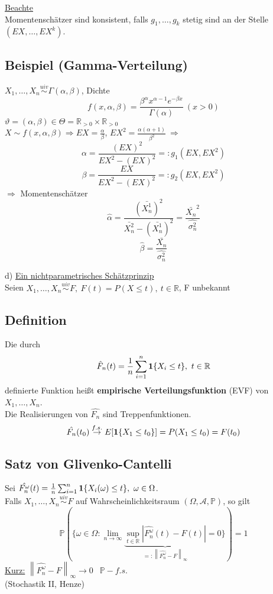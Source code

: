 \documentclass[a4paper,11pt,twoside,titlepage]{article}
\newcommand{\R}{{\mathbb R}}
\newcommand{\PP}{{\mathbb P}} %
\newcommand\AAA{ \mathcal{A} } %
\newcommand{\ind}{\text{\bf{1}}} %
\newcommand{\uiv}{\ensuremath{\stackrel{uiv}{\sim}}}
\begin{document}
\underline{Beachte}\\
Momentenschätzer sind konsistent, falls $g_1,\ldots,g_k$ stetig sind an der Stelle $(EX,\ldots,EX^k)$.

\subsection{Beispiel (Gamma-Verteilung)}
$X_1,\ldots,X_n\uiv \Gamma(\alpha,\beta)$, Dichte $$f(x,\alpha,\beta)=\frac{\beta^{\alpha}x^{\alpha-1}e^{-\beta x}}{\Gamma(\alpha)}\ (x>0)$$
$\vartheta=(\alpha,\beta)\in\Theta=\R_{>0}\times\R_{>0}$\\
$X\sim f(x,\alpha,\beta)\Rightarrow EX =\frac{\alpha}{\beta}$, $EX^2=\frac{\alpha(\alpha+1)}{\beta^2}\ \Rightarrow$ \[\alpha=\frac{(EX)^2}{EX^2-(EX)^2}=:g_1(EX,EX^2)\]\[\beta=\frac{EX}{EX^2-(EX)^2}=:g_2(EX,EX^2)\]
$\Rightarrow$ Momentenschätzer $$\hat{\alpha}=\frac{(\bar{X_n^1})^2}{\bar{X_n^2}-(\bar{X_n^1})^2}=\frac{\bar{X_n}^2}{\hat{\sigma_n^2}}$$
\[\hat{\beta}=\frac{\bar{X_n}}{\hat{\sigma_n^2}}\]

d) \underline{Ein nichtparametrisches Schätzprinzip}\\
Seien $X_1,\ldots,X_n\uiv F,\ F(t)=P(X\leq t),\ t\in\R$, F unbekannt

\subsection{Definition}
Die durch 
\[\hat F_n(t)=\frac1n\sum_{i=1}^n \ind\{ X_i\leq t\},\ t\in\R\] definierte Funktion heißt \textbf{empirische Verteilungsfunktion} (EVF) von 
$X_1,\ldots,X_n$.\\
Die Realisierungen von $\hat{F_n}$ sind Treppenfunktionen.
$$\hat{F_n}(t_0)\stackrel{f.s.}{\rightarrow}E[\ind\{X_1\leq t_0\}]=P(X_1\leq t_0) = F(t_0)$$

\subsection{Satz von Glivenko-Cantelli}
Sei $\hat{F_n^{\omega}}(t)=\frac1n\sum_{i=1}^n \ind\{ X_i(\omega)\leq t\},\ \omega\in\Omega$.\\
Falls $X_1,\ldots,X_n\uiv F$ auf Wahrscheinlichkeitsraum $(\Omega,\AAA,\PP)$, so gilt
$$ \PP(\{ \omega \in \Omega : \lim_{n\to\infty}\underbrace{\sup_{t\in\R}\left|\hat{F_n^{\omega}}(t)
-F(t)\right|}_{=:\left\|\hat{F_n^{\omega}}-F\right\|_{\infty}}=0\})=1$$
\underline{Kurz:} $\left\|\hat{F_n^{\omega}}-F\right\|_{\infty}\rightarrow 0\ $ $\ \PP-f.s.$ \\
(Stochastik II, Henze)
\end{document}
